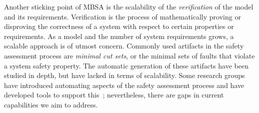 Another sticking point of MBSA is the scalability of the \emph{verification} of the model and its requirements. Verification is the process of mathematically proving or disproving the correctness of a system with respect to certain properties or requirements. As a model and the number of system requirements grows, a scalable approach is of utmost concern. Commonly used artifacts in the safety assessment process are \emph{minimal cut sets}, or the minimal sets of faults that violate a system safety property. The automatic generation of these artifacts have been studied in depth, but have lacked in terms of scalability. Some research groups have introduced automating aspects of the safety assessment process and have developed tools to support this~\cite{Joshi05:SafeComp,CAV2015:BoCiGrMa,10.1007/978-3-319-11936-6-7}; nevertheless, there are gaps in current capabilities we aim to address. 





